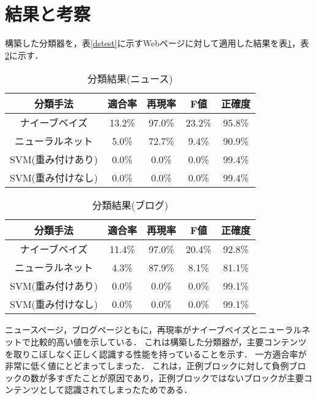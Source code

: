 \documentclass[a4paper,10pt,twocolumn]{jsarticle}
\begin{document}
\section{結果と考察}

構築した分類器を，表\ref{dstest}に示すWebページに対して適用した結果を表\ref{resultnews}，表\ref{resultblog}に示す．

\begin{table}[htbp]
\begin{center}
\caption{分類結果(ニュース)}\label{resultnews}
\vspace{-4mm}
\begin{tabular}{|c|c|c|c|c|} \hline
分類手法          & 適合率 & 再現率 & F値    & 正確度 \\ \hline\hline
ナイーブベイズ    & 13.2\% & 97.0\% & 23.2\% & 95.8\% \\ \hline
ニューラルネット  &  5.0\% & 72.7\% &  9.4\% & 90.9\% \\ \hline
SVM(重み付けあり) &  0.0\% &  0.0\% &  0.0\% & 99.4\% \\ \hline
SVM(重み付けなし) &  0.0\% &  0.0\% &  0.0\% & 99.4\% \\ \hline
\end{tabular}
\end{center}
\end{table}

\begin{table}[htbp]
\begin{center}
\caption{分類結果(ブログ)}\label{resultblog}
\vspace{-4mm}
\begin{tabular}{|c|c|c|c|c|} \hline
分類手法          & 適合率 & 再現率 & F値    & 正確度  \\ \hline\hline
ナイーブベイズ    & 11.4\% & 97.0\% & 20.4\% & 92.8\% \\ \hline
ニューラルネット  &  4.3\% & 87.9\% &  8.1\% & 81.1\% \\ \hline
SVM(重み付けあり) &  0.0\% &  0.0\% &  0.0\% & 99.1\% \\ \hline
SVM(重み付けなし) &  0.0\% &  0.0\% &  0.0\% & 99.1\% \\ \hline
\end{tabular}
\end{center}
\end{table}

ニュースページ，ブログページともに，再現率がナイーブベイズとニューラルネットで比較的高い値を示している．
これは構築した分類器が，主要コンテンツを取りこぼしなく正しく認識する性能を持っていることを示す．
一方適合率が非常に低く値にとどまってしまった．
これは，正例ブロックに対して負例ブロックの数が多すぎたことが原因であり，正例ブロックではないブロックが主要コンテンツとして認識されてしまったためである．
\end{document}
